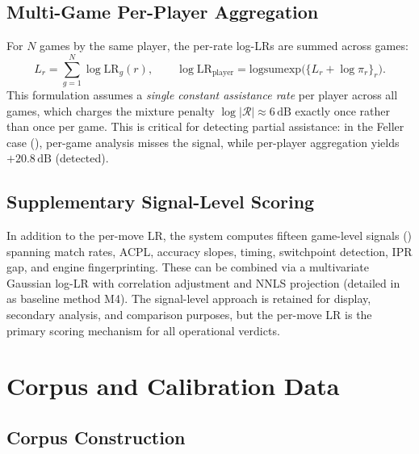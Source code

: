 \documentclass[11pt,a4paper]{article}
\newcommand{\dB}{\,\mathrm{dB}}
\theoremstyle{definition}
\begin{document}
\subsection{Multi-Game Per-Player Aggregation}
\label{sec:multigame}

For $N$ games by the same player, the per-rate log-LRs are summed across games:
\begin{equation}
  \label{eq:perplayer}
  L_r = \sum_{g=1}^{N} \log \mathrm{LR}_g(r),
  \qquad
  \log \mathrm{LR}_{\mathrm{player}}
  = \mathrm{logsumexp}\!\bigl(\{L_r + \log \pi_r\}_{r}\bigr).
\end{equation}
This formulation assumes a \emph{single constant assistance rate} per
player across all games, which charges the mixture penalty
$\log |\mathcal{R}| \approx 6\dB$ exactly once rather than once per
game.  This is critical for detecting partial assistance: in the Feller
case (), per-game analysis misses the signal, while
per-player aggregation yields $+20.8\dB$ (detected).

\subsection{Supplementary Signal-Level Scoring}
\label{sec:signal-scoring}

In addition to the per-move LR, the system computes fifteen game-level
signals () spanning match rates, ACPL, accuracy
slopes, timing, switchpoint detection, IPR gap, and engine
fingerprinting.  These can be combined via a multivariate Gaussian
log-LR with correlation adjustment and NNLS projection (detailed in
 as baseline method M4).  The signal-level approach
is retained for display, secondary analysis, and comparison purposes,
but the per-move LR is the primary scoring mechanism for all operational
verdicts.


\section{Corpus and Calibration Data}
\label{sec:data}

\subsection{Corpus Construction}
\end{document}
